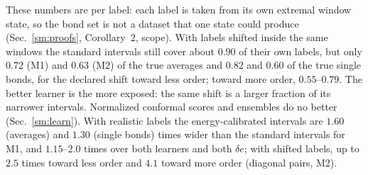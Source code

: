 \documentclass[aps,prx,onecolumn,10pt,nofootinbib,longbibliography,floatfix]{revtex4-2}
\theoremstyle{remark}
\newcommand{\de}{\delta e}
\begin{document}
These numbers are per label: each label is taken from its own extremal window state, so the bond set is not a
dataset that one state could produce (Sec.~\ref{sm:proofs}, Corollary~2, scope). With labels shifted inside the same %
windows the standard intervals still cover about $0.90$ of their own labels, but only $0.72$ (M1) and $0.63$ (M2) of %
the true averages and $0.82$ and $0.60$ of the true single bonds, for the declared shift toward less order; toward %
more order, $0.55$--$0.79$. The better learner is the more exposed: the same shift is a larger fraction of its %
narrower intervals. Normalized conformal scores and ensembles do no better (Sec.~\ref{sm:learn}). With realistic labels
the energy-calibrated intervals are $1.60$ (averages) and $1.30$ (single bonds) times wider than the standard intervals for %
M1, and $1.15$--$2.0$ times over both learners and both $\de$; with shifted labels, up to $2.5$ times toward less %
order and $4.1$ toward more order (diagonal pairs, M2). %
\end{document}
